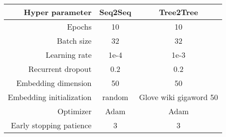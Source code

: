 \begin{tabular}{r|c|c}
\textbf{Hyper parameter} & \textbf{Seq2Seq} &      \textbf{Tree2Tree} \\
\hline
                   Epochs &                10 &                      10 \\
               Batch size &                32 &                      32 \\
            Learning rate &              1e-4 &                    1e-3 \\
        Recurrent dropout &               0.2 &                     0.2 \\
      Embedding dimension &                 50&                      50 \\
 Embedding initialization &            random &  Glove wiki gigaword 50 \\
                Optimizer &              Adam &                    Adam \\
  Early stopping patience &                 3 &                       3 \\
\end{tabular}
